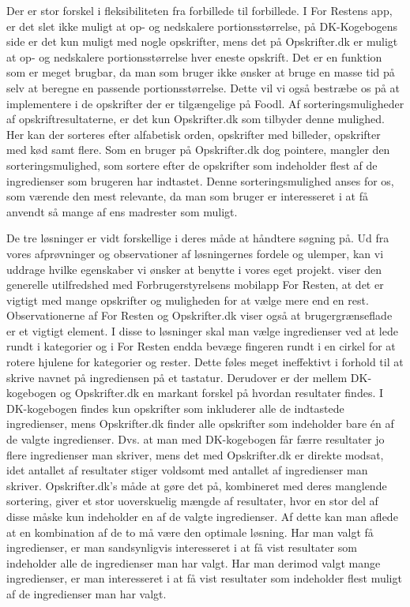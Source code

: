 Der er stor forskel i fleksibiliteten fra forbillede til forbillede. I For Restens app, er det slet ikke muligt at op- og nedskalere portionsstørrelse, på DK-Kogebogens side er det kun muligt med nogle opskrifter, mens det på Opskrifter.dk er muligt at op- og nedskalere portionsstørrelse hver eneste opskrift. Det er en funktion som er meget brugbar, da man som bruger ikke ønsker at bruge en masse tid på selv at beregne en passende portionsstørrelse. Dette vil vi også bestræbe os på at implementere i de opskrifter der er tilgængelige på Foodl. Af sorteringsmuligheder af opskriftresultaterne, er det kun Opskrifter.dk som tilbyder denne mulighed. Her kan der sorteres efter alfabetisk orden, opskrifter med billeder, opskrifter med kød samt flere. Som en bruger på Opskrifter.dk dog pointere, mangler den sorteringsmulighed, som sortere efter de opskrifter som indeholder flest af de ingredienser som brugeren har indtastet. Denne sorteringsmulighed anses for os, som værende den mest relevante, da man som bruger er interesseret i at få anvendt så mange af ens madrester som muligt. 

De tre løsninger er vidt forskellige i deres måde at håndtere søgning på. Ud fra vores afprøvninger og observationer af løsningernes fordele og ulemper, kan vi uddrage hvilke egenskaber vi ønsker at benytte i vores eget projekt. \Fx viser den generelle utilfredshed med Forbrugerstyrelsens mobilapp For Resten, at det er vigtigt med mange opskrifter og muligheden for at vælge mere end en rest. Observationerne af For Resten og Opskrifter.dk viser også at brugergrænseflade er et vigtigt element. I disse to løsninger skal man vælge ingredienser ved at lede rundt i kategorier og i For Resten endda bevæge fingeren rundt i en cirkel for at rotere hjulene for kategorier og rester. Dette føles meget ineffektivt i forhold til at skrive navnet på ingrediensen på et tastatur. Derudover er der mellem DK-kogebogen og Opskrifter.dk en markant forskel på hvordan resultater findes. I DK-kogebogen findes kun opskrifter som inkluderer alle de indtastede ingredienser, mens Opskrifter.dk finder alle opskrifter som indeholder bare én af de valgte ingredienser. Dvs. at man med DK-kogebogen får færre resultater jo flere ingredienser man skriver, mens det med Opskrifter.dk er direkte modsat, idet antallet af resultater stiger voldsomt med antallet af ingredienser man skriver. Opskrifter.dk’s måde at gøre det på, kombineret med deres manglende sortering, giver et stor uoverskuelig mængde af resultater, hvor en stor del af disse måske kun indeholder en af de valgte ingredienser. Af dette kan man aflede at en kombination af de to må være den optimale løsning. Har man valgt få ingredienser, er man sandsynligvis interesseret i at få vist resultater som indeholder alle de ingredienser man har valgt. Har man derimod valgt mange ingredienser, er man interesseret i at få vist resultater som indeholder flest muligt af de ingredienser man har valgt.
